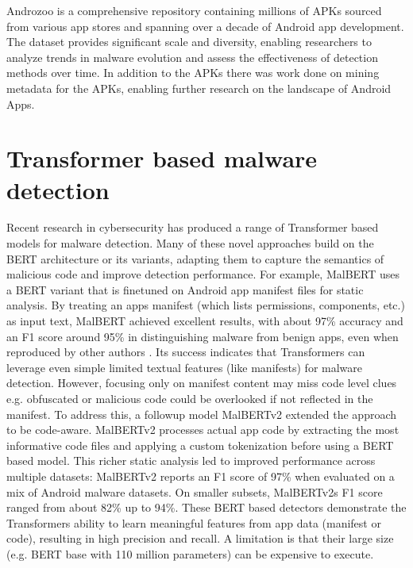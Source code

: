 Androzoo \cite{androzoo} is a comprehensive repository containing millions of APKs sourced 
from various app stores and spanning over a decade of Android app development.
The dataset provides significant scale and diversity, enabling researchers to analyze trends 
in malware evolution and assess the effectiveness of detection methods over time.
In addition to the APKs there was work done on mining metadata for the APKs, enabling further 
research on the landscape of Android Apps.


\section{Transformer based malware detection}

Recent research in cybersecurity has produced a range of Transformer based models for malware detection.
Many of these novel approaches build on the BERT 
\cite{bert} 
architecture or its variants, 
adapting them to capture the semantics of malicious code and improve detection performance. 
For example, MalBERT 
\cite{malbert}
uses a BERT variant that is finetuned on Android app manifest files for static analysis. 
By treating an apps manifest (which lists permissions, components, etc.) as input text, 
MalBERT achieved excellent results, with about 97\% accuracy and an F1 score around 95\% 
in distinguishing malware from benign apps, even when reproduced by other authors 
\cite{malbert_reproduce}. 
Its success indicates that Transformers can leverage even simple limited textual features (like manifests) 
for malware detection. 
However, focusing only on manifest content may miss code level clues e.g. 
obfuscated or malicious code could be overlooked if not reflected in the manifest. 
To address this, a followup model MalBERTv2 
\cite{malbert_two} 
extended the approach to be code-aware. 
MalBERTv2 processes actual app code by extracting the most informative code files and applying a 
custom tokenization before using a BERT based model.
This richer static analysis led to improved performance across multiple datasets: 
MalBERTv2 reports an F1 score of 97\% when evaluated on a mix of Android malware datasets.
On smaller subsets, MalBERTv2s F1 score ranged from about 82\% up to 94\%. 
These BERT based detectors demonstrate the Transformers ability to learn meaningful features from 
app data (manifest or code), resulting in high precision and recall. 
A limitation is that their large size (e.g. BERT base with 110 million parameters) can be expensive to execute. 

